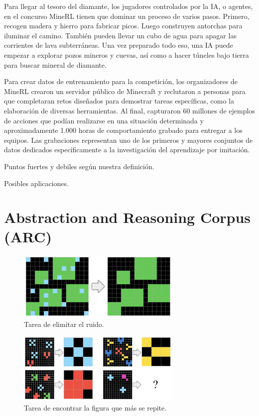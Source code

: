 Para llegar al tesoro del diamante, los jugadores controlados por la IA, o agentes, en el concurso MineRL tienen que dominar un proceso de varios pasos. Primero, recogen madera y hierro para fabricar picos. Luego construyen antorchas para iluminar el camino. También pueden llevar un cubo de agua para apagar las corrientes de lava subterráneas. Una vez preparado todo eso, una IA puede empezar a explorar pozos mineros y cuevas, así como a hacer túneles bajo tierra para buscar mineral de diamante.

Para crear datos de entrenamiento para la competición, los organizadores de MineRL crearon un servidor público de Minecraft y reclutaron a personas para que completaran retos diseñados para demostrar tareas específicas, como la elaboración de diversas herramientas. Al final, capturaron 60 millones de ejemplos de acciones que podían realizarse en una situación determinada y aproximadamente 1.000 horas de comportamiento grabado para entregar a los equipos. Las grabaciones representan uno de los primeros y mayores conjuntos de datos dedicados específicamente a la investigación del aprendizaje por imitación.

Puntos fuertes y debiles según nuestra definición.

Posibles aplicaciones.

\section{Abstraction and Reasoning Corpus (ARC)}\label{section:state-of-the-art:arc}

\begin{figure}[ht!]
    \centering
    \includegraphics[width=0.7\textwidth]{Graphics/arc-2.png}
    \caption{Tarea de elimitar el ruido.}
    \label{fig:arc-1}
\end{figure}

\begin{figure}[ht!]
    \centering
    \includegraphics[width=0.7\textwidth]{Graphics/arc-1.png}
    \caption{Tarea de encontrar la figura que más se repite.}
    \label{fig:arc-2}
\end{figure}


